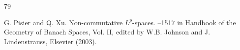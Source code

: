 \documentclass[leqno]{article} %
\numberwithin{equation}{section}
\begin{document}
\begin{thebibliography}{79}









%

G. Pisier and Q. Xu.
\newblock Non-commutative $L^p$-spaces.
--1517 in Handbook of the Geometry of Banach Spaces, Vol. II, edited by W.B. Johnson and J. Lindenstrauss, Elsevier (2003).



\end{thebibliography}
\end{document}
